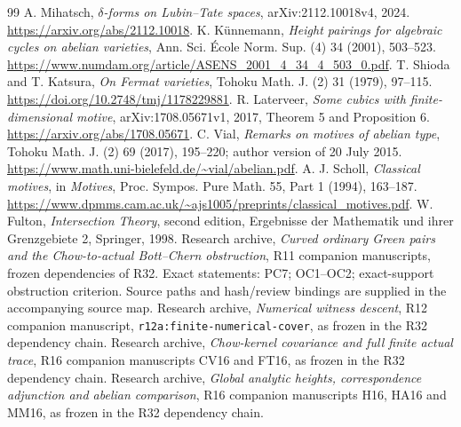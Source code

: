 \documentclass[11pt,a4paper]{article}
\theoremstyle{definition}
\theoremstyle{remark}\newtheorem{remark}[theorem]{Remark}
\numberwithin{equation}{section}
\begin{document}
\begin{thebibliography}{99}
 A. Mihatsch, \emph{$\delta$-forms on Lubin--Tate spaces},
arXiv:2112.10018v4, 2024. \url{https://arxiv.org/abs/2112.10018}.
 K. K\"unnemann, \emph{Height pairings for algebraic cycles on
abelian varieties}, Ann. Sci. \'Ecole Norm. Sup. (4) 34 (2001), 503--523.
\url{https://www.numdam.org/article/ASENS_2001_4_34_4_503_0.pdf}.
 T. Shioda and T. Katsura, \emph{On Fermat varieties},
Tohoku Math. J. (2) 31 (1979), 97--115.
\url{https://doi.org/10.2748/tmj/1178229881}.
 R. Laterveer, \emph{Some cubics with finite-dimensional
motive}, arXiv:1708.05671v1, 2017, Theorem 5 and Proposition 6.
\url{https://arxiv.org/abs/1708.05671}.
 C. Vial, \emph{Remarks on motives of abelian type},
Tohoku Math. J. (2) 69 (2017), 195--220; author version of 20 July 2015.
\url{https://www.math.uni-bielefeld.de/~vial/abelian.pdf}.
 A. J. Scholl, \emph{Classical motives}, in
\emph{Motives}, Proc. Sympos. Pure Math. 55, Part 1 (1994), 163--187.
\url{https://www.dpmms.cam.ac.uk/~ajs1005/preprints/classical_motives.pdf}.
 W. Fulton, \emph{Intersection Theory}, second edition,
Ergebnisse der Mathematik und ihrer Grenzgebiete 2, Springer, 1998.
 Research archive, \emph{Curved ordinary Green
pairs and the Chow-to-actual Bott--Chern obstruction}, R11 companion
manuscripts, frozen dependencies of R32. Exact statements: PC7;
OC1--OC2; exact-support obstruction criterion. Source paths and
hash/review bindings are supplied in the accompanying source map.
 Research archive,
\emph{Numerical witness descent}, R12 companion manuscript,
\texttt{r12a:finite-numerical-cover}, as frozen in the R32 dependency chain.
 Research archive,
\emph{Chow-kernel covariance and full finite actual trace}, R16 companion
manuscripts CV16 and FT16, as frozen in the R32 dependency chain.
 Research archive,
\emph{Global analytic heights, correspondence adjunction and abelian
comparison}, R16 companion manuscripts H16, HA16 and MM16,
as frozen in the R32 dependency chain.
\end{thebibliography}
\end{document}

